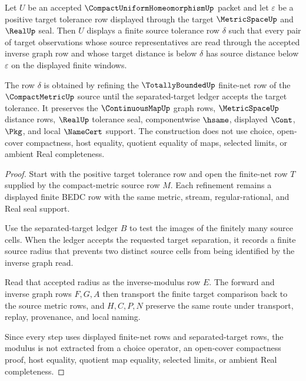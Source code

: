 \begin{theorem}\label{thm:compact-uniform-homeomorphism-inverse-modulus}
Let $U$ be an accepted $\CompactUniformHomeomorphismUp$ packet and let $\varepsilon$ be a positive target tolerance row displayed through the target $\MetricSpaceUp$ and $\RealUp$ seal. Then $U$ displays a finite source tolerance row $\delta$ such that every pair of target observations whose source representatives are read through the accepted inverse graph row and whose target distance is below $\delta$ has source distance below $\varepsilon$ on the displayed finite windows.

The row $\delta$ is obtained by refining the $\TotallyBoundedUp$ finite-net row of the $\CompactMetricUp$ source until the separated-target ledger accepts the target tolerance. It preserves the $\ContinuousMapUp$ graph rows, $\MetricSpaceUp$ distance rows, $\RealUp$ tolerance seal, componentwise $\hsame$, displayed $\Cont$, $\Pkg$, and local $\NameCert$ support. The construction does not use choice, open-cover compactness, host equality, quotient equality of maps, selected limits, or ambient Real completeness.
\end{theorem}
\begin{proof}
Start with the positive target tolerance row and open the finite-net row $T$ supplied by the compact-metric source row $M$. Each refinement remains a displayed finite BEDC row with the same metric, stream, regular-rational, and Real seal support.

Use the separated-target ledger $B$ to test the images of the finitely many source cells. When the ledger accepts the requested target separation, it records a finite source radius that prevents two distinct source cells from being identified by the inverse graph read.

Read that accepted radius as the inverse-modulus row $E$. The forward and inverse graph rows $F,G,A$ then transport the finite target comparison back to the source metric rows, and $H,C,P,N$ preserve the same route under transport, replay, provenance, and local naming.

Since every step uses displayed finite-net rows and separated-target rows, the modulus is not extracted from a choice operator, an open-cover compactness proof, host equality, quotient map equality, selected limits, or ambient Real completeness.
\end{proof}


